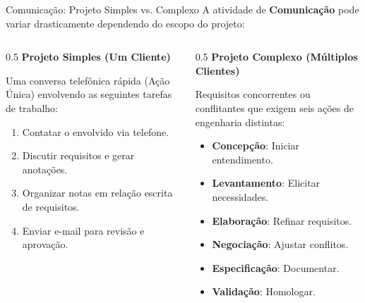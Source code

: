 \documentclass[9pt]{beamer}
\begin{document}
\begin{frame}{Comunicação: Projeto Simples vs. Complexo}
  A atividade de \textbf{Comunicação} pode variar drasticamente dependendo do escopo do projeto:

  \vspace{0.3cm}
  \begin{columns}[t]
    \begin{column}{0.5\textwidth}
      \colorbox{green!10}{\textbf{Projeto Simples (Um Cliente)}}
      \vspace{0.2cm}
      \scriptsize
      
      Uma conversa telefônica rápida (Ação Única) envolvendo as seguintes tarefas de trabalho:
      \begin{enumerate}
        \item Contatar o envolvido via telefone.
        \item Discutir requisitos e gerar anotações.
        \item Organizar notas em relação escrita de requisitos.
        \item Enviar e-mail para revisão e aprovação.
      \end{enumerate}
    \end{column}
    
    \begin{column}{0.5\textwidth}
      \colorbox{red!10}{\textbf{Projeto Complexo (Múltiplos Clientes)}}
      \vspace{0.2cm}
      \scriptsize
      
      Requisitos concorrentes ou conflitantes que exigem seis ações de engenharia distintas:
      \begin{itemize}
        \item \textbf{Concepção}: Iniciar entendimento.
        \item \textbf{Levantamento}: Elicitar necessidades.
        \item \textbf{Elaboração}: Refinar requisitos.
        \item \textbf{Negociação}: Ajustar conflitos.
        \item \textbf{Especificação}: Documentar.
        \item \textbf{Validação}: Homologar.
      \end{itemize}
    \end{column}
  \end{columns}
\end{frame}
\end{document}
